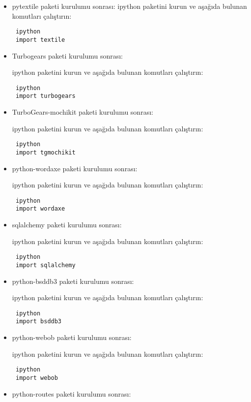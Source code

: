 \documentclass[a4paper,10pt]{article}
\begin{document}
\begin{itemize}
\item pytextile  paketi kurulumu sonrası:
ipython paketini kurun ve aşağıda bulunan komutları çalıştırın:
\begin{verbatim}
 ipython
 import textile
\end{verbatim}

\item Turbogears  paketi kurulumu sonrası:

ipython paketini kurun ve aşağıda bulunan komutları çalıştırın:
\begin{verbatim}
 ipython
 import turbogears
\end{verbatim}

\item TurboGears-mochikit  paketi kurulumu sonrası:

ipython paketini kurun ve aşağıda bulunan komutları çalıştırın:
\begin{verbatim}
 ipython
 import tgmochikit
\end{verbatim}


\item python-wordaxe paketi kurulumu sonrası:

ipython paketini kurun ve aşağıda bulunan komutları çalıştırın:
\begin{verbatim}
 ipython
 import wordaxe
\end{verbatim}


\item sqlalchemy paketi kurulumu sonrası:

ipython paketini kurun ve aşağıda bulunan komutları çalıştırın:
\begin{verbatim}
 ipython
 import sqlalchemy
\end{verbatim}


\item python-bsddb3 paketi kurulumu sonrası:

ipython paketini kurun ve aşağıda bulunan komutları çalıştırın:
\begin{verbatim}
 ipython
 import bsddb3
\end{verbatim}

\item python-webob paketi kurulumu sonrası:

ipython paketini kurun ve aşağıda bulunan komutları çalıştırın:
\begin{verbatim}
 ipython
 import webob
\end{verbatim}

\item python-routes paketi kurulumu sonrası:


\end{itemize}
\end{document}
